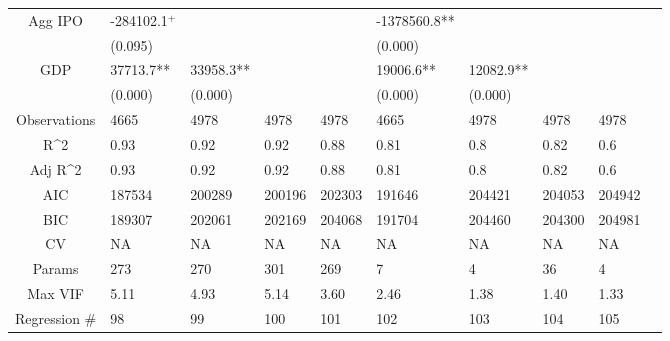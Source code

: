\documentclass{article}
\begin{document}
\begin{table}[H]
\begin{tabular}{|clllllllll|}
  Agg IPO & -284102.1$^{+}$ &  &  &  & -1378560.8** &  &  &  & \\ 
   & (0.095) &  &  &  & (0.000) &  &  &  & \\ 
  GDP & 37713.7** & 33958.3** &  &  & 19006.6** & 12082.9** &  &  & \\ 
   & (0.000) & (0.000) &  &  & (0.000) & (0.000) &  &  & \\ 
  \hline 
 Observations & 4665 & 4978 & 4978 & 4978 & 4665 & 4978 & 4978 & 4978 & \\ 
  R^2 & 0.93 & 0.92 & 0.92 & 0.88 & 0.81 & 0.8 & 0.82 & 0.6 & \\ 
  Adj R^2 & 0.93 & 0.92 & 0.92 & 0.88 & 0.81 & 0.8 & 0.82 & 0.6 & \\ 
  AIC & 187534 & 200289 & 200196 & 202303 & 191646 & 204421 & 204053 & 204942 & \\ 
  BIC & 189307 & 202061 & 202169 & 204068 & 191704 & 204460 & 204300 & 204981 & \\ 
  CV & NA & NA & NA & NA & NA & NA & NA & NA & \\ 
  Params & 273 & 270 & 301 & 269 & 7 & 4 & 36 & 4 & \\ 
  Max VIF & 5.11 & 4.93 & 5.14 & 3.60 & 2.46 & 1.38 & 1.40 & 1.33 & \\ 
  Regression \# & 98 & 99 & 100 & 101 & 102 & 103 & 104 & 105 & \\ 
   \hline
\end{tabular}
 
\end{table}
\end{document}
